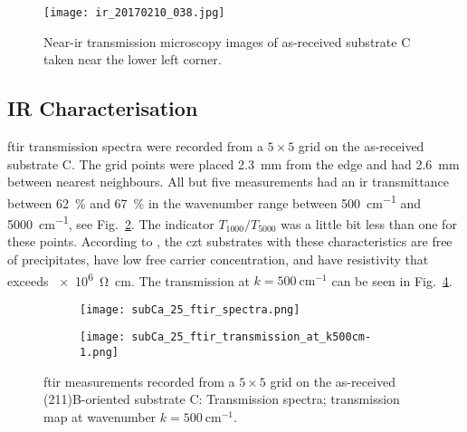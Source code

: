 \begin{figure}[htbp]
    \centering
    \texttt{[image: ir\_20170210\_038.jpg]}
    \caption[Near-\ac{ir} transmission microscopy of as-received substrate C.]{Near-\ac{ir} transmission microscopy images of as-received substrate C taken near the lower left corner.}
    \label{fig:subCa_irt}
\end{figure}

\subsection{IR Characterisation}

\Ac{ftir} transmission spectra were recorded from a $5\times5$ grid on the as-received substrate C. The grid points were placed \SI{2.3}{\milli\metre} from the edge and had \SI{2.6}{\milli\metre} between nearest neighbours. All but five measurements had an \ac{ir} transmittance between \SI{62}{\percent} and \SI{67}{\percent} in the wavenumber range between \SI{500}{\centi\metre^{-1}} and \SI{5000}{\centi\metre^{-1}}, see Fig.~\ref{fig:subCa_ftir_spectra}. The indicator $T_{1000}/T_{5000}$ was a little bit less than one for these points. According to \citet{yujie2004infrared}, the \ac{czt} substrates with these characteristics are free of precipitates, have low free carrier concentration, and have resistivity that exceeds \SI{e6}{\ohm\centi\metre}. The transmission at $k=\SI{500}{\centi\metre^{-1}}$ can be seen in Fig.~\ref{fig:subCa_ftir_map_500cm-1}.

\begin{figure}[htbp]
    \centering
    \begin{subfigure}[t]{0.60175438596\linewidth}
        \texttt{[image: subCa\_25\_ftir\_spectra.png]}
        \caption{}\label{fig:subCa_ftir_spectra}
    \end{subfigure}
    \hfill
    \begin{subfigure}[t]{0.37824561403\linewidth}
        \texttt{[image: subCa\_25\_ftir\_transmission\_at\_k500cm-1.png]}
        \caption{}\label{fig:subCa_ftir_map_500cm-1}
    \end{subfigure}
    \caption[\Ac{ftir} measurements of the as-received substrate C.]{\Acf{ftir} measurements recorded from a $5\times5$ grid on the as-received (211)B-oriented substrate C:  Transmission spectra;  transmission map at wavenumber $k=\SI{500}{\centi\metre^{-1}}$.}
\end{figure}

